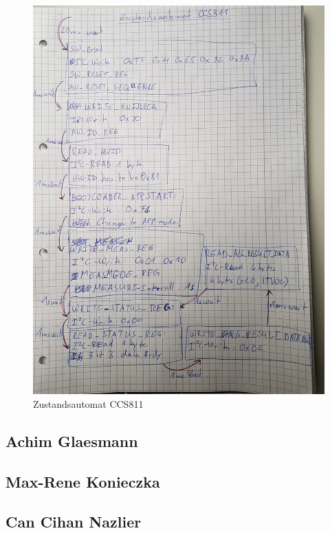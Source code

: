 \documentclass[]{article}
\begin{document}
\begin{figure}[h]
	\centering
	\includegraphics[scale=0.20]{images/zustandsautomat_ccs811}
	\caption{Zustandsautomat CCS811}
	\label{img:Zustandsautomat}
\end{figure}

\subsection{Achim Glaesmann}


\subsection{Max-Rene Konieczka}

\subsection{Can Cihan Nazlier}


\printbibliography
\end{document}
